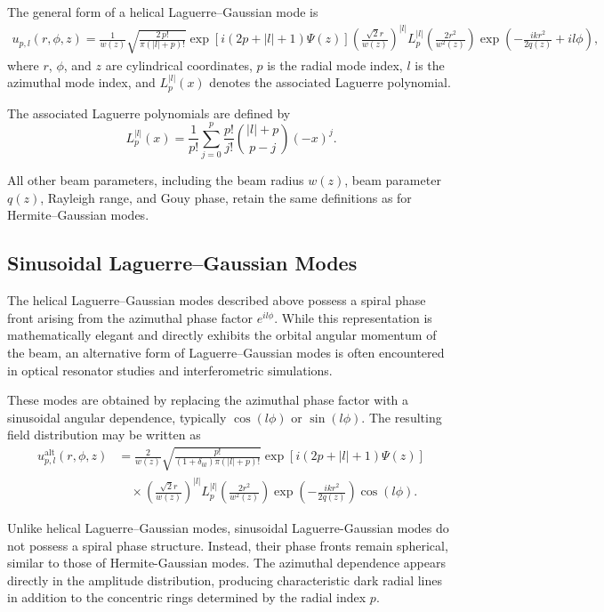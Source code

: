 \documentclass{report}
\begin{document}
The general form of a helical Laguerre--Gaussian mode is
\begin{align}
u_{p,l}(r,\phi,z)=
\frac{1}{w(z)}
\sqrt{\frac{2\,p!}{\pi (|l|+p)!}}
\exp\!\left[i(2p+|l|+1)\Psi(z)\right]
\left(
\frac{\sqrt{2}r}{w(z)}
\right)^{|l|}
L_p^{|l|}
\!\left(
\frac{2r^2}{w^2(z)}
\right)
\exp\!\left(
-\frac{ikr^2}{2q(z)}
+i l\phi
\right),
\end{align}
where $r$, $\phi$, and $z$ are cylindrical coordinates, $p$ is the radial mode index, $l$ is the azimuthal mode index, and $L_p^{|l|}(x)$ denotes the associated Laguerre polynomial.

The associated Laguerre polynomials are defined by
\begin{equation}
L_p^{|l|}(x)
=
\frac{1}{p!}
\sum_{j=0}^{p}
\frac{p!}{j!}
\binom{|l|+p}{p-j}
(-x)^j.
\end{equation}

All other beam parameters, including the beam radius $w(z)$, beam parameter $q(z)$, Rayleigh range, and Gouy phase, retain the same definitions as for Hermite--Gaussian modes.

\subsection{Sinusoidal Laguerre--Gaussian Modes}

The helical Laguerre--Gaussian modes described above possess a spiral phase front arising from the azimuthal phase factor $e^{il\phi}$. While this representation is mathematically elegant and directly exhibits the orbital angular momentum of the beam, an alternative form of Laguerre--Gaussian modes is often encountered in optical resonator studies and interferometric simulations.

These modes are obtained by replacing the azimuthal phase factor with a sinusoidal angular dependence, typically $\cos(l\phi)$ or $\sin(l\phi)$. The resulting field distribution may be written as
\begin{align}
u^{\mathrm{alt}}_{p,l}(r,\phi,z)
&=
\frac{2}{w(z)}
\sqrt{
\frac{p!}
     {(1+\delta_{0l})\pi(|l|+p)!}
}
\exp\!\left[i(2p+|l|+1)\Psi(z)\right]
\nonumber\\
&\quad\times
\left(
\frac{\sqrt{2}r}{w(z)}
\right)^{|l|}
L_p^{|l|}
\!\left(
\frac{2r^2}{w^2(z)}
\right)
\exp\!\left(
-\frac{ikr^2}{2q(z)}
\right)
\cos(l\phi).
\end{align}

Unlike helical Laguerre--Gaussian modes, sinusoidal Laguerre-Gaussian modes do not possess a spiral phase structure. Instead, their phase fronts remain spherical, similar to those of Hermite-Gaussian modes. The azimuthal dependence appears directly in the amplitude distribution, producing characteristic dark radial lines in addition to the concentric rings determined by the radial index $p$.
\end{document}
